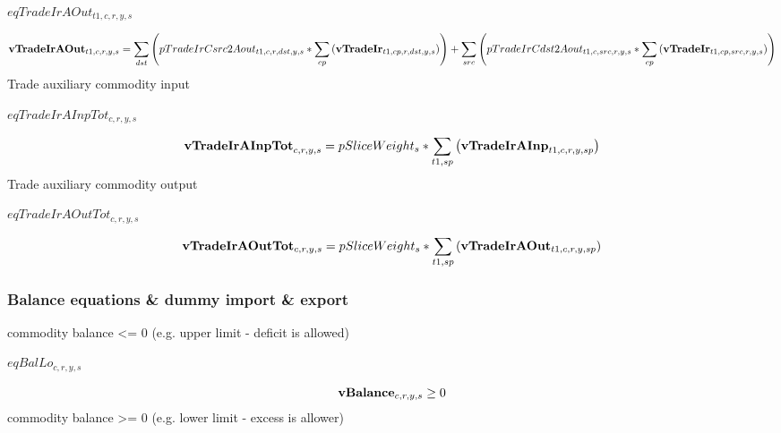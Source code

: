 \documentclass{article}
\begin{document}
$eqTradeIrAOut_{t1,c,r,y,s}$





\begin{dmath}
{\bf vTradeIrAOut}_{t1,c,r,y,s}  =  \sum_{dst}{\left(pTradeIrCsrc2Aout_{t1,c,r,dst,y,s}*\sum_{cp}{\left({\bf vTradeIr}_{t1,cp,r,dst,y,s}\right)}\right)}+\sum_{src}{\left(pTradeIrCdst2Aout_{t1,c,src,r,y,s}*\sum_{cp}{\left({\bf vTradeIr}_{t1,cp,src,r,y,s}\right)}\right)}
\end{dmath}
Trade auxiliary commodity input







$eqTradeIrAInpTot_{c,r,y,s}$





\begin{dmath}
{\bf vTradeIrAInpTot}_{c,r,y,s}  =  pSliceWeight_{s}*\sum_{t1,sp}{\left({\bf vTradeIrAInp}_{t1,c,r,y,sp}\right)}
\end{dmath}
Trade auxiliary commodity output







$eqTradeIrAOutTot_{c,r,y,s}$





\begin{dmath}
{\bf vTradeIrAOutTot}_{c,r,y,s}  =  pSliceWeight_{s}*\sum_{t1,sp}{\left({\bf vTradeIrAOut}_{t1,c,r,y,sp}\right)}
\end{dmath}
\subsubsection*{Balance equations \& dummy import \& export}
commodity balance <= 0 (e.g. upper limit - deficit is allowed)







$eqBalLo_{c,r,y,s}$





\begin{dmath}
{\bf vBalance}_{c,r,y,s}  \ge  0
\end{dmath}
commodity balance >= 0 (e.g. lower limit - excess is allower)
\end{document}
